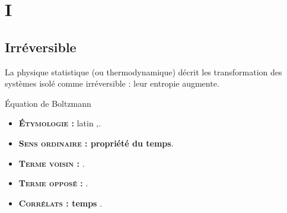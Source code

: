 \chapter{I}
\section{Irréversible}

La physique statistique (ou thermodynamique) décrit les transformation des systèmes isolé comme irréversible : leur entropie augmente.

    Équation de Boltzmann
    


{\footnotesize
\begin{itemize}[leftmargin=1cm, label=, itemsep=1pt]
\item {\bf \textsc{Étymologie} :} latin {\it },.
\item {\bf \textsc{Sens ordinaire} : propriété du temps}.
\end{itemize}

\begin{itemize}[leftmargin=1cm, label=, itemsep=1pt]
\item {\bf \textsc{Terme voisin} :} .
\item {\bf \textsc{Terme opposé} :} .
\item {\bf \textsc{Corrélats} : temps} .
\end{itemize}
}
